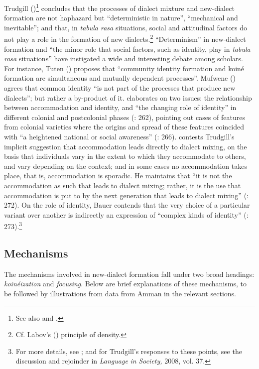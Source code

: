 \documentclass[output=paper]{langsci/langscibook}
\begin{document}
Trudgill (\citeyear[149]{Trudgill2004})\footnote{See also \citet{TrudgillEtAl2000} and \citet{Trudgill2008}.} concludes that the processes of dialect mixture and new-dialect formation are not haphazard but “deterministic in nature”, “mechanical and inevitable”; and that, in \textit{tabula rasa} situations, social and attitudinal factors do not play a role in the formation of new dialects.\footnote{Cf. Labov's (\citeyear{Labov2001}) principle of density.} “Determinism” in new-dialect formation and “the minor role that social factors, such as identity, play in \textit{tabula rasa} situations” have instigated a wide and interesting debate among scholars. For instance, Tuten (\citeyear[261]{Tuten2008}) proposes that “community identity formation and koiné formation are simultaneous and mutually dependent processes”. Mufwene (\citeyear[258]{Mufwene2008}) agrees that common identity “is not part of the processes that produce new dialects”; but rather a by-product of it. \citet{Schneider2008} elaborates on two issues: the relationship between accommodation and identity, and “the changing role of identity” in different colonial and postcolonial phases (\citeyear{Schneider2008}: 262), pointing out cases of features from colonial varieties where the origins and spread of these features coincided with “a heightened national or social awareness” (\citeyear{Schneider2008}: 266). \citet{Bauer2008} contests Trudgill’s implicit suggestion that accommodation leads directly to dialect mixing, on the basis that individuals vary in the extent to which they accommodate to others, and vary depending on the context; and in some cases no accommodation takes place, that is, accommodation is sporadic. He maintains that “it is not the accommodation as such that leads to dialect mixing; rather, it is the use that accommodation is put to by the next generation that leads to dialect mixing” (\citeyear{Bauer2008}: 272). On the role of identity, Bauer contends that the very choice of a particular variant over another is indirectly an expression of “complex kinds of identity” (\citeyear{Bauer2008}: 273).\footnote{For more details, see \citet{Bauer2008}; and for Trudgill’s responses to these points, see the discussion and rejoinder in \textit{Language} \textit{in} \textit{Society,} 2008, vol. 37.}

\subsection{Mechanisms}

The mechanisms involved in new-dialect formation fall under two broad headings: \textit{koinéization} and \textit{focusing}. Below are brief explanations of these mechanisms, to be followed by illustrations from data from Amman in the relevant sections.
\end{document}
